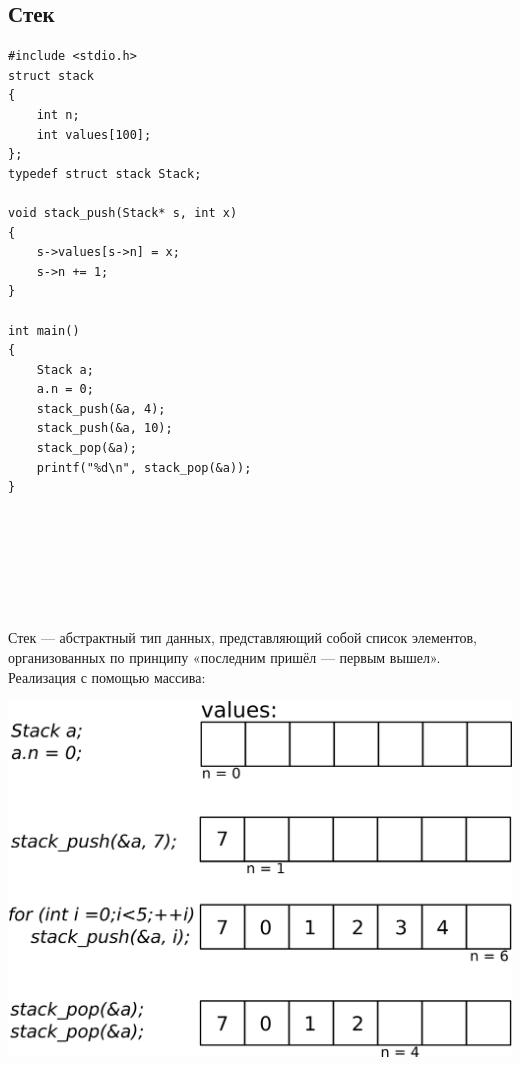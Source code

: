 \documentclass{article}
\begin{document}
\subsection*{Стек}
\begin{multicols}{2}
\begin{lstlisting}
#include <stdio.h>
struct stack
{
    int n;
    int values[100];
};
typedef struct stack Stack;

void stack_push(Stack* s, int x)
{
    s->values[s->n] = x;
    s->n += 1;
}

int main()
{
    Stack a;
    a.n = 0;
    stack_push(&a, 4);
    stack_push(&a, 10);
    stack_pop(&a);
    printf("%d\n", stack_pop(&a));
}

\end{lstlisting}
\quad\\
\\
\\
\\
\\
\\
Стек — абстрактный тип данных, представляющий собой список элементов, организованных по принципу «последним пришёл — первым вышел». \\

Реализация с помощью массива:

\begin{center}
\includegraphics[width=0.95\linewidth]{../images/stack.png}
\end{center}
\end{multicols}
\end{document}
